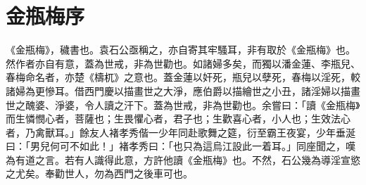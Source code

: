 \chapter*{金瓶梅序}


《金瓶梅》，穢書也。袁石公亟稱之，亦自寄其牢騷耳，非有取於《金瓶梅》也。然作者亦自有意，蓋為世戒，非為世勸也。如諸婦多矣，而獨以潘金蓮、李瓶兒、春梅命名者，亦楚《檮杌》之意也。蓋金蓮以奸死，瓶兒以孽死，春梅以淫死，較諸婦為更慘耳。借西門慶以描畫世之大淨，應伯爵以描繪世之小丑，諸淫婦以描畫世之醜婆、淨婆，令人讀之汗下。蓋為世戒，非為世勸也。余嘗曰：「讀《金瓶梅》而生憐憫心者，菩薩也；生畏懼心者，君子也；生歡喜心者，小人也；生效法心者，乃禽獸耳。」餘友人褚孝秀偕一少年同赴歌舞之筵，衍至霸王夜宴，少年垂涎曰：「男兒何可不如此！」褚孝秀曰：「也只為這烏江設此一着耳。」同座聞之，嘆為有道之言。若有人識得此意，方許他讀《金瓶梅》也。不然，石公幾為導淫宣慾之尤矣。奉勸世人，勿為西門之後車可也。

\begin{quotation}
\end{quotation}

